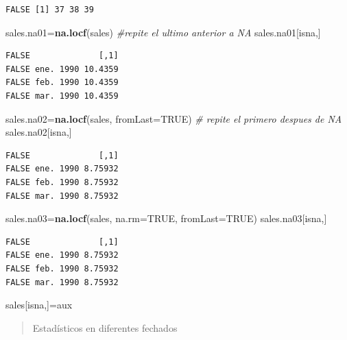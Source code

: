 \documentclass[]{book}
\newenvironment{Shaded}{\begin{snugshade}}{\end{snugshade}}
\newcommand{\CommentTok}[1]{\textcolor[rgb]{0.56,0.35,0.01}{\textit{#1}}}
\newcommand{\DataTypeTok}[1]{\textcolor[rgb]{0.13,0.29,0.53}{#1}}
\newcommand{\KeywordTok}[1]{\textcolor[rgb]{0.13,0.29,0.53}{\textbf{#1}}}
\newcommand{\NormalTok}[1]{#1}
\newcommand{\OtherTok}[1]{\textcolor[rgb]{0.56,0.35,0.01}{#1}}
\begin{document}
\begin{verbatim}
FALSE [1] 37 38 39
\end{verbatim}

\begin{Shaded}
\begin{Highlighting}[]
\NormalTok{sales.na01=}\KeywordTok{na.locf}\NormalTok{(sales) }\CommentTok{#repite el ultimo anterior a NA}
\NormalTok{ sales.na01[isna,]}
\end{Highlighting}
\end{Shaded}

\begin{verbatim}
FALSE              [,1]
FALSE ene. 1990 10.4359
FALSE feb. 1990 10.4359
FALSE mar. 1990 10.4359
\end{verbatim}

\begin{Shaded}
\begin{Highlighting}[]
\NormalTok{sales.na02=}\KeywordTok{na.locf}\NormalTok{(sales, }\DataTypeTok{fromLast=}\OtherTok{TRUE}\NormalTok{) }\CommentTok{# repite el primero despues de NA}
\NormalTok{ sales.na02[isna,]}
\end{Highlighting}
\end{Shaded}

\begin{verbatim}
FALSE              [,1]
FALSE ene. 1990 8.75932
FALSE feb. 1990 8.75932
FALSE mar. 1990 8.75932
\end{verbatim}

\begin{Shaded}
\begin{Highlighting}[]
\NormalTok{sales.na03=}\KeywordTok{na.locf}\NormalTok{(sales, }\DataTypeTok{na.rm=}\OtherTok{TRUE}\NormalTok{, }\DataTypeTok{fromLast=}\OtherTok{TRUE}\NormalTok{)}
\NormalTok{ sales.na03[isna,]}
\end{Highlighting}
\end{Shaded}

\begin{verbatim}
FALSE              [,1]
FALSE ene. 1990 8.75932
FALSE feb. 1990 8.75932
FALSE mar. 1990 8.75932
\end{verbatim}

\begin{Shaded}
\begin{Highlighting}[]
\NormalTok{sales[isna,]=aux}
\end{Highlighting}
\end{Shaded}

\begin{quote}
Estadísticos en diferentes fechados
\end{quote}
\end{document}
